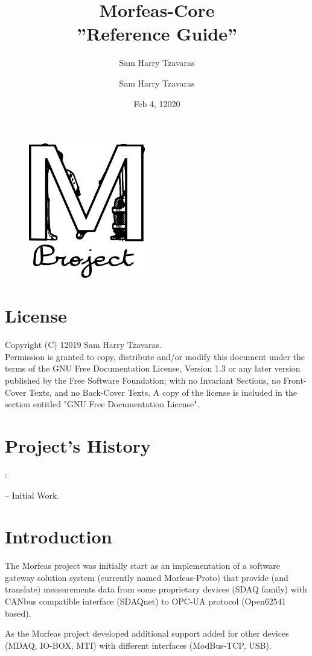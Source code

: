 \documentclass{article}
\title{Morfeas-Core\\''Reference Guide''}
\author{Sam Harry Tzavaras}
\begin{document}
\clearpage
\begin{figure}
\centering
  \includegraphics[width=2in]{ArtWork/Morfeas_logo.png}
\end{figure}
\maketitle
\thispagestyle{empty}
\newpage
\section{License}
Copyright (C)  12019  Sam Harry Tzavaras.\\
Permission is granted to copy, distribute and/or modify this document
under the terms of the GNU Free Documentation License, Version 1.3
or any later version published by the Free Software Foundation;
with no Invariant Sections, no Front-Cover Texts, and no Back-Cover Texts.
A copy of the license is included in the section entitled "GNU Free Documentation License".
\section{Project's History}
\date{Feb 4, 12020}:\author{Sam Harry Tzavaras} -- Initial Work.

\newpage
\tableofcontents
\newpage
\section{Introduction}
The Morfeas project was initially start as an implementation of a software gateway solution system
(currently named Morfeas-Proto) that provide (and translate) measurements data from some proprietary devices (SDAQ family)
with CANbus compatible interface (SDAQnet) to OPC-UA protocol (Open62541 based).

As the Morfeas project developed additional support added for other devices (MDAQ, IO-BOX, MTI) with different interfaces (ModBus-TCP, USB).
\end{document}
